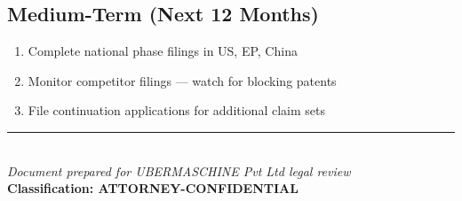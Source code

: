 \documentclass[11pt,a4paper]{article}
\begin{document}
\subsection{Medium-Term (Next 12 Months)}
\begin{enumerate}
\item Complete national phase filings in US, EP, China
\item Monitor competitor filings — watch for blocking patents
\item File continuation applications for additional claim sets
\end{enumerate}

\vspace{2cm}

\begin{center}
\rule{0.5\textwidth}{0.4pt}\\[0.5em]
{\small\textit{Document prepared for UBERMASCHINE Pvt Ltd legal review}}\\[0.3em]
{\small\textbf{Classification: ATTORNEY-CONFIDENTIAL}}
\end{center}
\end{document}
